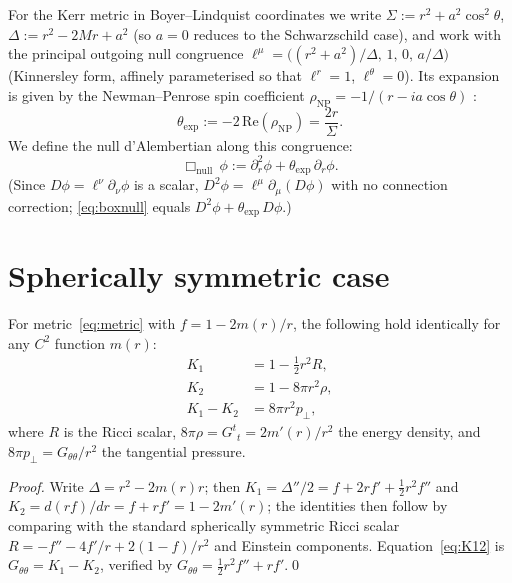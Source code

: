 \documentclass{iopart}
\begin{document}
For the Kerr metric in Boyer--Lindquist coordinates we write
$\Sigma:=r^2+a^2\cos^2\!\theta$,\;
$\Delta:=r^2-2Mr+a^2$ (so $a=0$ reduces to the Schwarzschild
case), and work with the principal outgoing null congruence
$\ell^\mu=\bigl((r^2+a^2)/\Delta,\,1,\,0,\,a/\Delta\bigr)$
(Kinnersley form, affinely parameterised so that $\ell^r=1$,
$\ell^\theta=0$).
Its expansion is given by the Newman--Penrose spin coefficient
$\rho_{\scriptscriptstyle\mathrm{NP}}=-1/(r-ia\cos\theta)$
\cite[Sec.~56]{Chandrasekhar1983}:
\begin{equation}\label{eq:theta}
  \theta_{\mathrm{exp}}
  := -2\,\mathrm{Re}(\rho_{\scriptscriptstyle\mathrm{NP}})
  = \frac{2r}{\Sigma}.
\end{equation}
We define the null d'Alembertian along this congruence:
\begin{equation}\label{eq:boxnull}
  \Box_{\mathrm{null}}\,\phi
  := \partial_r^2\phi + \theta_{\mathrm{exp}}\,\partial_r\phi.
\end{equation}
(Since $D\phi=\ell^\nu\partial_\nu\phi$ is a scalar,
$D^2\phi=\ell^\mu\partial_\mu(D\phi)$ with no connection correction;
\eqref{eq:boxnull} equals $D^2\phi+\theta_{\mathrm{exp}}\,D\phi$.)

\section{Spherically symmetric case}\label{sec:sph}

\begin{theorem}\label{thm:spherical}
For metric~\eqref{eq:metric} with $f=1-2m(r)/r$,
the following hold identically for any $C^2$ function $m(r)$:
\begin{align}
  K_1 &= 1 - \tfrac{1}{2}r^2 R, \label{eq:K1R}\\
  K_2 &= 1 - 8\pi r^2\rho,       \label{eq:K2rho}\\
  K_1-K_2 &= 8\pi r^2 p_{\!\perp},  \label{eq:K12}
\end{align}
where $R$ is the Ricci scalar, $8\pi\rho=G^t{}_t=2m'(r)/r^2$
the energy density, and $8\pi p_{\!\perp}=G_{\theta\theta}/r^2$
the tangential pressure.
\end{theorem}

\begin{proof}
Write $\Delta=r^2-2m(r)r$; then $K_1=\Delta''/2=f+2rf'+\tfrac{1}{2}r^2f''$ and
$K_2=d(rf)/dr=f+rf'=1-2m'(r)$; the identities then follow by
comparing with the standard spherically symmetric Ricci
scalar $R=-f''-4f'/r+2(1-f)/r^2$ and Einstein components.
Equation~\eqref{eq:K12} is $G_{\theta\theta}=K_1-K_2$,
verified by $G_{\theta\theta}=\tfrac{1}{2}r^2f''+rf'$.\qed
\end{proof}
\end{document}
